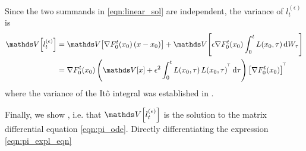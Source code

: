 Since the two summands in \cref{eqn:linear_sol} are independent, the variance of \(l_t^{(\epsilon)}\) is
\begin{align*}
	\var{l_t^{(\epsilon)}} & = \var{\nabla F_0^t\!\left(x_0\right) \left(x - x_0\right)} + \var{\epsilon \nabla F_0^t\!\left(x_0\right)\int_0^t{L\!\left(x_0,\tau\right)\dif W_\tau}}                                      \\
	                       & = \nabla F_0^t\!\left(x_0\right) \left(\var{x} + \epsilon^2\int_0^t{L\!\left(x_0, \tau\right)L\!\left(x_0, \tau\right)^{\T} \dif\tau}\right) \left[\nabla F_0^t\!\left(x_0\right)\right]^{\T}
\end{align*}
where the variance of the It\^o integral was established in .

Finally, we show , i.e. that \(\var{l_t^{(\epsilon)}}\) is the solution to the matrix differential equation \cref{eqn:pi_ode}.
Directly differentiating the expression \cref{eqn:pi_expl_eqn}
